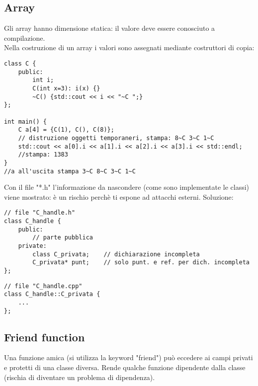 \documentclass{article}
\begin{document}
\subsection{Array}
Gli array hanno dimensione statica: il valore deve essere conosciuto a
compilazione.\\

Nella costruzione di un array i valori sono assegnati mediante costruttori di
copia:
\begin{lstlisting}
class C {
    public:
        int i;
        C(int x=3): i(x) {}
        ~C() {std::cout << i << "~C ";}
};

int main() {
    C a[4] = {C(1), C(), C(8)};
    // distruzione oggetti temporaneri, stampa: 8~C 3~C 1~C
    std::cout << a[0].i << a[1].i << a[2].i << a[3].i << std::endl;
    //stampa: 1383
}
//a all'uscita stampa 3~C 8~C 3~C 1~C
\end{lstlisting}

Con il file "*.h" l'informazione da nascondere (come sono implementate le
classi) viene mostrato: è un rischio perchè ti espone ad attacchi esterni.
Soluzione:
\begin{lstlisting}
// file "C_handle.h"
class C_handle {
    public:
        // parte pubblica
    private:
        class C_privata;    // dichiarazione incompleta
        C_privata* punt;    // solo punt. e ref. per dich. incompleta
};
\end{lstlisting}
\begin{lstlisting}
// file "C_handle.cpp"
class C_handle::C_privata {
    ...
};
\end{lstlisting}

\subsection{Friend function}
Una funzione amica (si utilizza la keyword "friend") può eccedere ai campi
privati e protetti di una classe diversa. Rende qualche funzione dipendente
dalla classe (rischia di diventare un problema di dipendenza).
    
\end{document}
